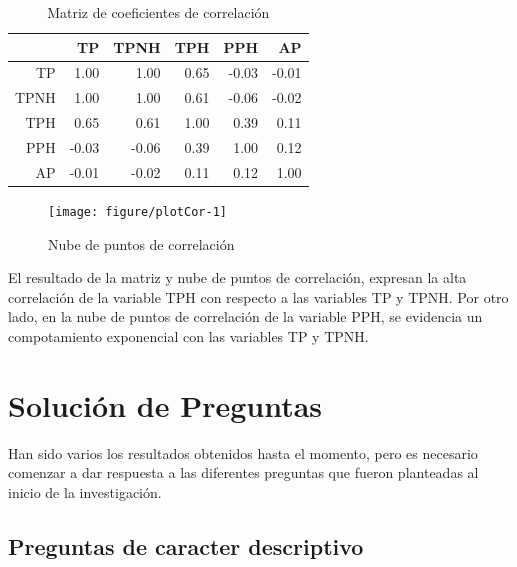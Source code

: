 \documentclass[conference]{IEEEtran}\usepackage[]{graphicx}\usepackage[]{color}
\newenvironment{knitrout}{}{} %
\begin{document}
\vspace{-2mm}
\begin{table}[ht]
\centering
\begin{tabular}{rrrrrr}
  \hline
 & TP & TPNH & TPH & PPH & AP \\ 
  \hline
TP & 1.00 & 1.00 & 0.65 & -0.03 & -0.01 \\ 
  TPNH & 1.00 & 1.00 & 0.61 & -0.06 & -0.02 \\ 
  TPH & 0.65 & 0.61 & 1.00 & 0.39 & 0.11 \\ 
  PPH & -0.03 & -0.06 & 0.39 & 1.00 & 0.12 \\ 
  AP & -0.01 & -0.02 & 0.11 & 0.12 & 1.00 \\ 
   \hline
\end{tabular}
\caption{Matriz de coeficientes de correlación} 
\end{table}

\vspace{-6mm}
\begin{figure}[H]
	\centering
\begin{knitrout}
\color{fgcolor}
\texttt{[image: figure/plotCor-1]} 

\end{knitrout}
	\caption{Nube de puntos de correlación}
\end{figure}

El resultado de la matriz y nube de puntos de correlación, expresan la alta correlación de la variable TPH con respecto a las variables TP y TPNH.  Por otro lado, en la nube de puntos de correlación de la variable PPH, se evidencia un compotamiento exponencial con las variables TP y TPNH. 
	



\section{Solución de Preguntas}
Han sido varios los resultados obtenidos hasta el momento, pero es necesario comenzar a dar respuesta a las diferentes preguntas que fueron planteadas al inicio de la investigación.

\subsection{Preguntas de caracter descriptivo}
\end{document}
